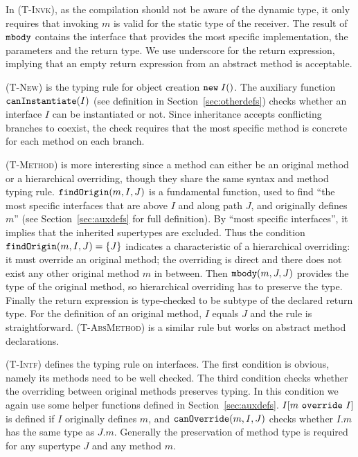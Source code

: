 In \textsc{(T-Invk)}, as the compilation should not be aware
of the dynamic type, it only requires that invoking $m$ is valid for the static type of the
receiver. The result of $\texttt{mbody}$ contains the interface that provides the most specific implementation,
the parameters and the return type. We use underscore for the return expression, implying that an empty return expression
from an abstract method is acceptable.

\textsc{(T-New)} is the typing rule for object creation $\texttt{new} \; I()$. The
auxiliary function $\texttt{canInstantiate}(I)$ (see definition in Section~\ref{sec:otherdefs}) checks whether an interface $I$ 
can be instantiated or not. Since \wordfork{} inheritance accepts conflicting branches to coexist, the check requires that the most specific method is concrete for each method on each branch.

\textsc{(T-Method)} is more interesting since a method can either be an original method or a hierarchical overriding, though
they share the same syntax and method typing rule. $\texttt{findOrigin}(m, I, J)$ is a fundamental function,
used to find ``the most specific interfaces that are above $I$ and
along path $J$, and originally defines $m$'' (see
Section~\ref{sec:auxdefs} for full definition).
By ``most specific interfaces'',
it implies that the inherited supertypes are excluded. Thus the condition $\texttt{findOrigin}(m, I, J) = \{J\}$ indicates a characteristic of a hierarchical overriding: it must override an original method; the overriding is direct and there does not exist any other original method $m$ in between.
Then $\texttt{mbody}(m, J, J)$ provides the type of the original method, so hierarchical overriding has to preserve the type. Finally the return expression
is type-checked to be subtype of the declared return type. For the definition of an original method, $I$ equals $J$ and the rule is straightforward. \textsc{(T-AbsMethod)} is a similar rule but works on abstract method declarations.

\textsc{(T-Intf)} defines the typing rule on interfaces. The first condition is obvious, namely its methods need to be well checked. The third
condition checks whether the overriding between original methods preserves typing. In this condition we again use some helper functions defined in  Section~\ref{sec:auxdefs}. $I[m\ \texttt{override}\ I]$ is defined if $I$ originally defines $m$, and $\texttt{canOverride}(m, I, J)$ checks whether $I.m$ has the same type as $J.m$. Generally the preservation of method type is required for any supertype $J$ and any method $m$.

